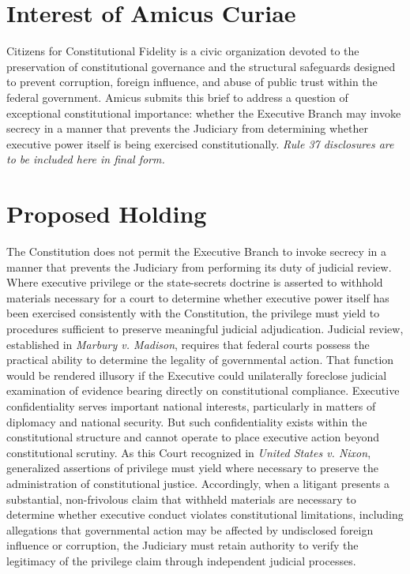 \documentclass[12pt]{article}
\begin{document}
\section*{Interest of Amicus Curiae}
Citizens for Constitutional Fidelity is a civic organization devoted to the preservation of constitutional governance and the structural safeguards designed to prevent corruption, foreign influence, and abuse of public trust within the federal government.
Amicus submits this brief to address a question of exceptional constitutional importance: whether the Executive Branch may invoke secrecy in a manner that prevents the Judiciary from determining whether executive power itself is being exercised constitutionally.
\emph{Rule 37 disclosures are to be included here in final form.}

\section*{Proposed Holding}
The Constitution does not permit the Executive Branch to invoke secrecy in a manner that prevents the Judiciary from performing its duty of judicial review.
Where executive privilege or the state-secrets doctrine is asserted to withhold materials necessary for a court to determine whether executive power itself has been exercised consistently with the Constitution, the privilege must yield to procedures sufficient to preserve meaningful judicial adjudication.
Judicial review, established in \emph{Marbury v. Madison}, requires that federal courts possess the practical ability to determine the legality of governmental action.
That function would be rendered illusory if the Executive could unilaterally foreclose judicial examination of evidence bearing directly on constitutional compliance.
Executive confidentiality serves important national interests, particularly in matters of diplomacy and national security.
But such confidentiality exists within the constitutional structure and cannot operate to place executive action beyond constitutional scrutiny.
As this Court recognized in \emph{United States v. Nixon}, generalized assertions of privilege must yield where necessary to preserve the administration of constitutional justice.
Accordingly, when a litigant presents a substantial, non-frivolous claim that withheld materials are necessary to determine whether executive conduct violates constitutional limitations, including allegations that governmental action may be affected by undisclosed foreign influence or corruption, the Judiciary must retain authority to verify the legitimacy of the privilege claim through independent judicial processes.
\end{document}
